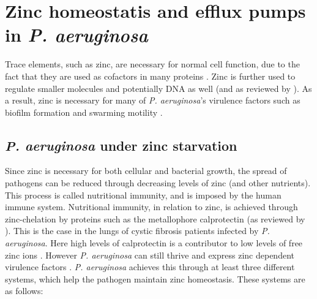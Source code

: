 \section{Zinc homeostatis and efflux pumps in \textit{P. aeruginosa}}

Trace elements, such as zinc, are necessary for normal cell function, due to the fact that they are used as cofactors in many proteins \cite{Blencowe2003ZnIIProkaryotes}\cite{McCall2000FunctionMetalloenzymes}. Zinc is further used to regulate smaller molecules and potentially DNA as well \cite{Nejdl2014DNAIons} (and as reviewed by \cite{Krezel2016TheIons}). As a result, zinc is necessary for many of \textit{P. aeruginosa}’s virulence factors such as biofilm formation and swarming motility \cite{Mastropasqua2018EfficientLung}.

\subsection{\textit{P. aeruginosa} under zinc starvation}

Since zinc is necessary for both cellular and bacterial growth, the spread of pathogens can be reduced through decreasing levels of zinc (and other nutrients). This process is called nutritional immunity, and is imposed by the human immune system. Nutritional immunity, in relation to zinc, is achieved through zinc-chelation by proteins such as the metallophore calprotectin (as reviewed by \cite{Gonzalez2019PseudomonasPathogen}). This is the case in the lungs of cystic fibrosis patients infected by \textit{P. aeruginosa}. Here  high levels of calprotectin is a contributor to low levels of free zinc ions \cite{Gray2012SputumDiseases}. However \textit{P. aeruginosa} can still thrive and express zinc dependent virulence factors \cite{Mastropasqua2018EfficientLung}. \textit{P. aeruginosa} achieves this through at least three different systems, which help the pathogen maintain zinc homeostasis. These systems are as follows: 

